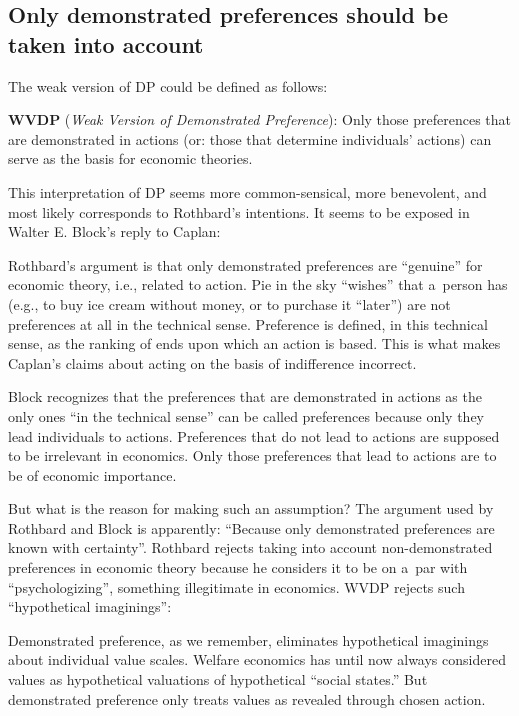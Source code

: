 \subsection{Only demonstrated preferences should be taken into account}



The weak version of DP could be defined as follows:



\textbf{WVDP} (\textit{Weak Version of Demonstrated Preference}): Only those preferences that are demonstrated in actions (or: those that determine individuals' actions) can serve as the basis for economic theories.



This interpretation of DP seems more common-sensical, more benevolent, and most likely corresponds to Rothbard's intentions. It seems to be exposed in Walter E. Block's reply to Caplan:



Rothbard's argument is that only demonstrated preferences are ``genuine'' for economic theory, i.e., related to action. Pie in the sky ``wishes'' that a~person has (e.g., to buy ice cream without money, or to purchase it ``later'') are not preferences at all in the technical sense. Preference is defined, in this technical sense, as the ranking of ends upon which an action is based. This is what makes Caplan's claims about acting on the basis of indifference incorrect. 
\parencite[][p.23]{block_austrian_1999}%




Block recognizes that the preferences that are demonstrated in actions as the only ones ``in the technical sense'' can be called preferences because only they lead individuals to actions. Preferences that do not lead to actions are supposed to be irrelevant in economics. Only those preferences that lead to actions are to be of economic importance.



But what is the reason for making such an assumption? The argument used by Rothbard and Block is apparently: ``Because only demonstrated preferences are known with certainty''. Rothbard rejects taking into account non-demonstrated preferences in economic theory because he considers it to be on a~par with ``psychologizing'', something illegitimate in economics. WVDP rejects such ``hypothetical imaginings'':



Demonstrated preference, as we remember, eliminates hypothetical imaginings about individual value scales. Welfare economics has until now always considered values as hypothetical valuations of hypothetical ``social states.'' But demonstrated preference only treats values as revealed through chosen action. 
\parencite[][p.320]{rothbard_present_2011}%




